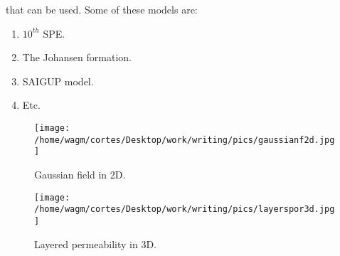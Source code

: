\documentclass[12pt]{report}
\begin{document}
that can be used. Some of these models are:
\begin{enumerate}
 \item $10^{th}$ SPE. 
 \item The Johansen formation.
 \item SAIGUP model.
 \item Etc.
\end{enumerate}
\begin{figure}[ht]
\centering
\begin{minipage}{.6\textwidth}
\texttt{[image: /home/wagm/cortes/Desktop/work/writing/pics/gaussianf2d.jpg]}
\caption{Gaussian field in 2D.}
\label{fig:Gaussf2D}
\end{minipage}%
\begin{minipage}{.5\textwidth}
\centering
\texttt{[image: /home/wagm/cortes/Desktop/work/writing/pics/layerspor3d.jpg]}
\caption{Layered permeability in 3D.}
\label{fig:layperm3D}
\end{minipage}
\end{figure}
\end{document}
